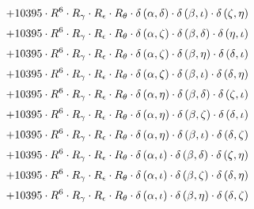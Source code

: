 \begin{subequations}
\begin{gather}
 \\[0.2em] \notag 		 + 10395 \cdot R^{6} \cdot R_{\gamma{}} \cdot R_{\epsilon{}} \cdot R_{\theta{}} \cdot \delta{}\left(\alpha{}, \delta{}\right) \cdot \delta{}\left(\beta{}, \iota{}\right) \cdot \delta{}\left(\zeta{}, \eta{}\right) 
 \\[0.2em] \notag 		 + 10395 \cdot R^{6} \cdot R_{\gamma{}} \cdot R_{\epsilon{}} \cdot R_{\theta{}} \cdot \delta{}\left(\alpha{}, \zeta{}\right) \cdot \delta{}\left(\beta{}, \delta{}\right) \cdot \delta{}\left(\eta{}, \iota{}\right) 
 \\[0.2em] \notag 		 + 10395 \cdot R^{6} \cdot R_{\gamma{}} \cdot R_{\epsilon{}} \cdot R_{\theta{}} \cdot \delta{}\left(\alpha{}, \zeta{}\right) \cdot \delta{}\left(\beta{}, \eta{}\right) \cdot \delta{}\left(\delta{}, \iota{}\right) 
 \\[0.2em] \notag 		 + 10395 \cdot R^{6} \cdot R_{\gamma{}} \cdot R_{\epsilon{}} \cdot R_{\theta{}} \cdot \delta{}\left(\alpha{}, \zeta{}\right) \cdot \delta{}\left(\beta{}, \iota{}\right) \cdot \delta{}\left(\delta{}, \eta{}\right) 
 \\[0.2em] \notag 		 + 10395 \cdot R^{6} \cdot R_{\gamma{}} \cdot R_{\epsilon{}} \cdot R_{\theta{}} \cdot \delta{}\left(\alpha{}, \eta{}\right) \cdot \delta{}\left(\beta{}, \delta{}\right) \cdot \delta{}\left(\zeta{}, \iota{}\right) 
 \\[0.2em] \notag 		 + 10395 \cdot R^{6} \cdot R_{\gamma{}} \cdot R_{\epsilon{}} \cdot R_{\theta{}} \cdot \delta{}\left(\alpha{}, \eta{}\right) \cdot \delta{}\left(\beta{}, \zeta{}\right) \cdot \delta{}\left(\delta{}, \iota{}\right) 
 \\[0.2em] \notag 		 + 10395 \cdot R^{6} \cdot R_{\gamma{}} \cdot R_{\epsilon{}} \cdot R_{\theta{}} \cdot \delta{}\left(\alpha{}, \eta{}\right) \cdot \delta{}\left(\beta{}, \iota{}\right) \cdot \delta{}\left(\delta{}, \zeta{}\right) 
 \\[0.2em] \notag 		 + 10395 \cdot R^{6} \cdot R_{\gamma{}} \cdot R_{\epsilon{}} \cdot R_{\theta{}} \cdot \delta{}\left(\alpha{}, \iota{}\right) \cdot \delta{}\left(\beta{}, \delta{}\right) \cdot \delta{}\left(\zeta{}, \eta{}\right) 
 \\[0.2em] \notag 		 + 10395 \cdot R^{6} \cdot R_{\gamma{}} \cdot R_{\epsilon{}} \cdot R_{\theta{}} \cdot \delta{}\left(\alpha{}, \iota{}\right) \cdot \delta{}\left(\beta{}, \zeta{}\right) \cdot \delta{}\left(\delta{}, \eta{}\right) 
 \\[0.2em] \notag 		 + 10395 \cdot R^{6} \cdot R_{\gamma{}} \cdot R_{\epsilon{}} \cdot R_{\theta{}} \cdot \delta{}\left(\alpha{}, \iota{}\right) \cdot \delta{}\left(\beta{}, \eta{}\right) \cdot \delta{}\left(\delta{}, \zeta{}\right) 

\end{gather}
\end{subequations}
